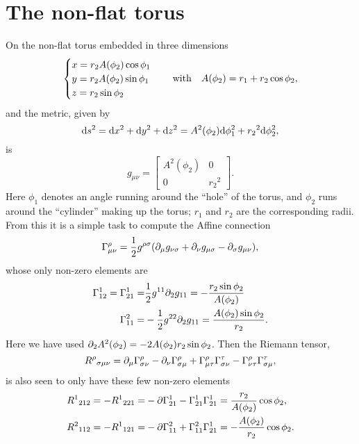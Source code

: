 \documentclass[11pt,a4paper, 
swedish, english %
]{article}
\begin{document}
\section{The non-flat torus}
On the non-flat torus embedded in three dimensions 
\begin{equation}
\begin{cases}
x=r_2A(\phi_2)\cos\phi_1\\
y=r_2A(\phi_2)\sin\phi_1\\
z=r_2\sin\phi_2
\end{cases}
\qq{with}
A(\phi_2)=r_1+r_2\cos\phi_2,
\end{equation}
and the metric, given by 
\begin{equation}
\mathrm{d}{s}^2=\mathrm{d}{x}^2+\mathrm{d}{y}^2+\mathrm{d}{z}^2
=A^2(\phi_2)\mathrm{d}\phi_1^2+{r_2}^2\mathrm{d}\phi_2^2,
\end{equation}
is
\begin{equation}
g_{\mu\nu}=
\begin{bmatrix}
A^2(\phi_2)&0\\
0&{r_2}^2
\end{bmatrix}.
\end{equation}
Here $\phi_1$ denotes an angle running around the ``hole'' of the
torus, and $\phi_2$ runs around the ``cylinder'' making up the torus;
$r_1$ and $r_2$ are the corresponding radii.
From this it is a simple task to compute the Affine connection
\begin{equation}
\Gamma^\rho_{\mu\nu}=\frac{1}{2}g^{\rho\sigma}
\qty(\partial_{\mu}g_{\nu\sigma}+\partial_{\nu}g_{\mu\sigma}-\partial_{\sigma}g_{\mu\nu}),
\end{equation}
whose only non-zero elements are 
\begin{equation}\label{eq11:affine}
\begin{aligned}
\Gamma^1_{12}=\Gamma^1_{21}
=&\frac{1}{2}g^{11}\partial_2g_{11}
=-\frac{r_2\sin\phi_2}{A(\phi_2)}\\
\Gamma^2_{11}=&-\frac{1}{2}g^{22}\partial_2g_{11}
=\frac{A(\phi_2)\sin\phi_2}{r_2}.
\end{aligned}
\end{equation}
Here we have used $\partial_2A^2(\phi_2)=-2A(\phi_2){r_2}\sin\phi_2$. Then
the Riemann tensor,
\begin{equation}
{R^\rho}_{\sigma\mu\nu}=
\partial_{\mu}\Gamma^\rho_{\sigma\nu}-\partial_{\nu}\Gamma^\rho_{\sigma\mu}
+\Gamma^\rho_{\mu\tau}\Gamma^\tau_{\sigma\nu}
-\Gamma^\rho_{\nu\tau}\Gamma^\tau_{\sigma\mu},
\end{equation}
is also seen to only have these few non-zero elements
\begin{equation}
\begin{aligned}
{R^1}_{212}=-{R^1}_{221}=&-\partial\Gamma^1_{21}-\Gamma^1_{21}\Gamma^1_{21}
=\frac{r_2}{A(\phi_2)}\cos\phi_2,\\
{R^2}_{112}=-{R^1}_{121}=&-\partial\Gamma^2_{11}+\Gamma^2_{11}\Gamma^1_{21}
=-\frac{A(\phi_2)}{r_2}\cos\phi_2.
\end{aligned}
\end{equation}
\end{document}
